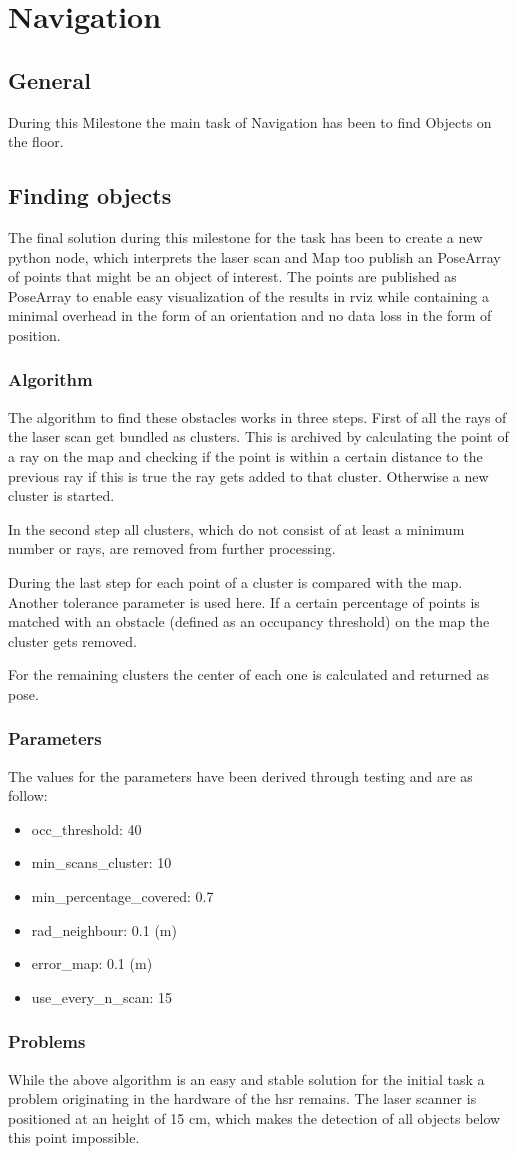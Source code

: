 \documentclass[main.tex]{subfiles}
\begin{document}
	
	\chapter{Navigation}
		\section{General}
		During this Milestone the main task of Navigation has been to find Objects on the floor.
		
		\section{Finding objects}
		The final solution during this milestone for the task has been to create a new python node, which interprets the laser scan and Map too publish an PoseArray of points that might be an object of interest. The points are published as PoseArray to enable easy visualization of the results in rviz while containing a minimal overhead in the form of an orientation and no data loss in the form of position.
		
		\subsection{Algorithm}
		The algorithm to find these obstacles works in three steps. First of all the rays of the laser scan get bundled as clusters. This is archived by calculating the point of a ray on the map and checking if the point is within a certain distance to the previous ray if this is true the ray gets added to that cluster. Otherwise a new cluster is started.
		
		In the second step all clusters, which do not consist of at least a minimum number or rays, are removed from further processing.
		
		During the last step for each point of a cluster is compared with the map. Another tolerance parameter is used here. If a certain percentage of points is matched with an obstacle (defined as an occupancy threshold) on the map the cluster gets removed.
		
		For the remaining clusters the center of each one is calculated and returned as pose.
		
		\subsection{Parameters}
		The values for the parameters have been derived through testing and are as follow:
		\begin{itemize}
			\item occ\_threshold: 40 
			\item min\_scans\_cluster: 10
			\item min\_percentage\_covered: 0.7
			\item rad\_neighbour: 0.1 (m)
			\item error\_map: 0.1 (m)
			\item use\_every\_n\_scan: 15
		\end{itemize}
		
		\subsection{Problems} 
		While the above algorithm is an easy and stable solution for the initial task a problem originating in the hardware of the hsr remains. The laser scanner is positioned at an height of 15 cm, which makes the detection of all objects below this point impossible.
	
	
\end{document}
